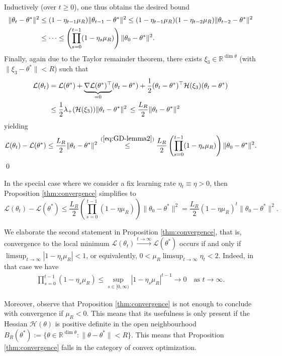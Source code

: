 \documentclass{article}
\begin{document}
Inductively (over $t\geq0$), one thus obtains the desired bound
\begin{align}
\|\theta_t-\theta^*\|^2 &\leq (1-\eta_{t-1}\mu_R)\|\theta_{t-1}-\theta^*\|^2\leq(1-\eta_{t-1}\mu_R)(1-\eta_{t-2}\mu_R)\|\theta_{t-2}-\theta^*\|^2 \notag
\\ &\leq\cdots\leq \left(\prod_{s=0}^{t-1}(1-\eta_s\mu_R)\right)\|\theta_0-\theta^*\|^2.
\end{align}
Finally, again due to the Taylor remainder theorem, there exists $\xi_3\in\mathbb{R}^{\dim\theta}$ (with $\|\xi_3-\theta^*\|< R$) such that
\begin{align}
\mathcal{L}(\theta_t) &= \mathcal{L}(\theta^*)+\underbrace{\nabla\mathcal{L}(\theta^*)^\top}_{=0}(\theta_t-\theta^*)+\frac{1}{2}(\theta_t-\theta^*)^\top\mathcal{H}(\xi_3)(\theta_t-\theta^*) \notag
\\ &\leq \frac{1}{2}\lambda_+(\mathcal{H}(\xi_3))\|\theta_t-\theta^*\|^2\,\leq\frac{L_R}{2}\|\theta_t-\theta^*\|^2
\end{align}
yielding
\begin{equation}
\mathcal{L}(\theta_t)-\mathcal{L}(\theta^*)\leq\frac{L_R}{2}\|\theta_t-\theta^*\|^2\,\stackrel{(\ref{eq:GD-lemma2})}{\leq}\frac{L_R}{2}\left(\prod_{s=0}^{t-1}(1-\eta_s\mu_R)\right)\|\theta_0-\theta^*\|^2.
\end{equation}
\qed
\bigskip
\par
In the special case where we consider a fix learning rate $\eta_t\equiv\eta>0$, then Proposition \ref{thm:convergence} simplifies to
\begin{equation}
\mathcal{L}(\theta_t)-\mathcal{L}(\theta^*)\leq\frac{L_R}{2}\left(\prod_{s=0}^{t-1}(1-\eta\mu_R)\right)\|\theta_0-\theta^*\|^2=\frac{L_R}{2}(1-\eta\mu_R)^t\|\theta_0-\theta^*\|^2.
\end{equation}
\par
We elaborate the second statement in Proposition \ref{thm:convergence}, that is, convergence to the local minimum $\mathcal{L}(\theta_t)\stackrel{t\to\infty}{\to}\mathcal{L}(\theta^*)$ occurs if and only if $\limsup_{t\to\infty}|1-\eta_t\mu_R|<1$, or equivalently, $0<\mu_R\limsup_{t\to\infty}\eta_t<2$. Indeed, in that case we have
\begin{align}
\prod_{s=0}^{t-1}(1-\eta_s\mu_R)\leq\sup_{s\in[0,\infty)}|1-\eta_s\mu_R|^{t-1}\to0\quad\text{as $t\to\infty$}.
\end{align}
\par
Moreover, observe that Proposition \ref{thm:convergence} is not enough to conclude with convergence if $\mu_R<0$. This means that its usefulness is only present if the Hessian $\mathcal{H}(\theta)$ is positive definite in the open neighbourhood $B_R(\theta^*):=\{\theta\in\mathbb{R}^{\dim\theta}:\|\theta-\theta^*\|< R\}$. This means that Proposition \ref{thm:convergence} falls in the category of convex optimization.
\end{document}
